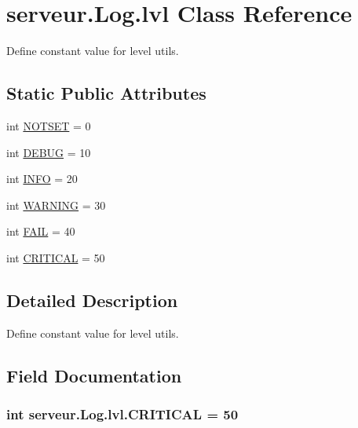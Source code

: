 \hypertarget{classserveur_1_1_log_1_1lvl}{}\section{serveur.\+Log.\+lvl Class Reference}
\label{classserveur_1_1_log_1_1lvl}


Define constant value for level utils.  


\subsection*{Static Public Attributes}
\begin{DoxyCompactItemize}
\item 
int \hyperlink{classserveur_1_1_log_1_1lvl_acaa05cc282bc9b0128c493b020bb48ab}{N\+O\+T\+S\+E\+T} = 0
\item 
int \hyperlink{classserveur_1_1_log_1_1lvl_a79f7942be26d5ccc11b551eeb9d60028}{D\+E\+B\+U\+G} = 10
\item 
int \hyperlink{classserveur_1_1_log_1_1lvl_a1c8e117210c2731d0a8f97d0d6b10f02}{I\+N\+F\+O} = 20
\item 
int \hyperlink{classserveur_1_1_log_1_1lvl_ab256311e15a538d505fa9f217a1bdc5c}{W\+A\+R\+N\+I\+N\+G} = 30
\item 
int \hyperlink{classserveur_1_1_log_1_1lvl_ac7ca969c5252d62014a59909b71956c5}{F\+A\+I\+L} = 40
\item 
int \hyperlink{classserveur_1_1_log_1_1lvl_a71fad7298d560ea3fb4238288a3d6af4}{C\+R\+I\+T\+I\+C\+A\+L} = 50
\end{DoxyCompactItemize}


\subsection{Detailed Description}
Define constant value for level utils. 

\subsection{Field Documentation}
\hypertarget{classserveur_1_1_log_1_1lvl_a71fad7298d560ea3fb4238288a3d6af4}{}
\subsubsection[{C\+R\+I\+T\+I\+C\+A\+L}]{\setlength{\rightskip}{0pt plus 5cm}int serveur.\+Log.\+lvl.\+C\+R\+I\+T\+I\+C\+A\+L = 50\hspace{0.3cm}{\ttfamily [static]}}\label{classserveur_1_1_log_1_1lvl_a71fad7298d560ea3fb4238288a3d6af4}
\hypertarget{classserveur_1_1_log_1_1lvl_a79f7942be26d5ccc11b551eeb9d60028}{}
